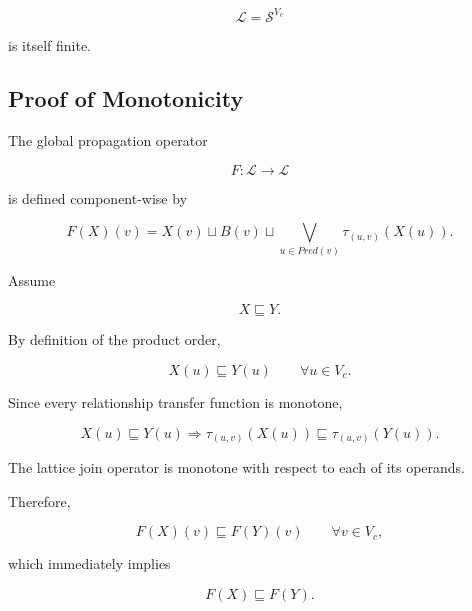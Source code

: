 \documentclass[10pt]{article}
\begin{document}
\begin{equation}
\mathcal{L}
=
\mathcal{S}^{V_c}
\end{equation}

is itself finite.


\subsection{Proof of Monotonicity}

The global propagation operator

\begin{equation}
F:\mathcal{L}\rightarrow\mathcal{L}
\end{equation}

is defined component-wise by

\begin{equation}
F(X)(v)
=
X(v)
\sqcup
B(v)
\sqcup
\bigvee_{u\in Pred(v)}
\tau_{(u,v)}
(X(u)).
\end{equation}

Assume

\begin{equation}
X
\sqsubseteq
Y.
\end{equation}

By definition of the product order,

\begin{equation}
X(u)
\sqsubseteq
Y(u)
\qquad
\forall u\in V_c.
\end{equation}

Since every relationship transfer function is monotone,

\begin{equation}
X(u)
\sqsubseteq
Y(u)
\Longrightarrow
\tau_{(u,v)}(X(u))
\sqsubseteq
\tau_{(u,v)}(Y(u)).
\end{equation}

The lattice join operator is monotone with respect to each of its operands.

Therefore,

\begin{equation}
F(X)(v)
\sqsubseteq
F(Y)(v)
\qquad
\forall v\in V_c,
\end{equation}

which immediately implies

\begin{equation}
F(X)
\sqsubseteq
F(Y).
\end{equation}
\end{document}
